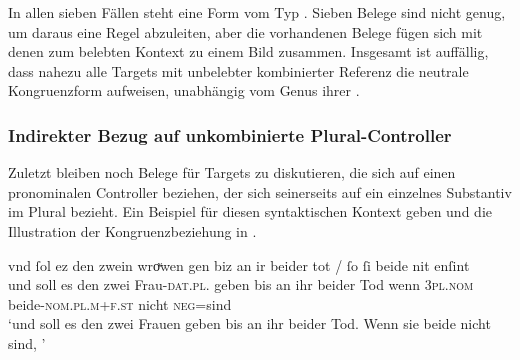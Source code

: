 In allen sieben Fällen steht eine Form vom Typ . Sieben Belege
sind nicht genug, um daraus eine Regel abzuleiten, aber die vorhandenen Belege
fügen sich mit denen zum belebten Kontext zu einem Bild zusammen.
Insgesamt ist auffällig, dass nahezu alle Targets mit unbelebter kombinierter
Referenz die neutrale Kongruenzform  aufweisen, unabhängig vom
Genus ihrer .


\subsubsection{Indirekter Bezug auf unkombinierte Plural-Controller}
\label{subsubsec:beid2p2snglncao}

Zuletzt bleiben noch Belege für Targets zu diskutieren, die sich auf einen
pronominalen Controller beziehen, der sich seinerseits auf ein einzelnes
Substantiv im Plural bezieht. Ein Beispiel für diesen syntaktischen Kontext
geben  und die Illustration der
Kongruenzbeziehung in
.

\begin{exe}
\ex \label{ex:beid2p2snglncao}
	\gll vnd ſol ez den zwein wroͮwen gen biz an ir beider tot / ſo
			ſi beide nit enſint \textelp{} \\
		und soll es den zwei Frau-\textsc{dat.pl.\FemF} geben bis an ihr
			beider Tod {} wenn \textsc{3pl\subF.nom}
			beide-\textsc{nom.pl.m+f\subF.st} nicht \textsc{neg}=sind {} \\
	\trans `und soll es den zwei Frauen geben bis an ihr beider Tod.
		Wenn sie beide nicht  sind, \textelp{}'
		\parencites(Nr.~2568, Sirnau, Kr.~Esslingen, 1297)[3,31]{cao4}
\end{exe}

